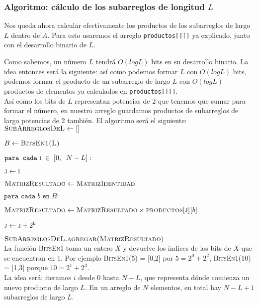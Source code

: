 \subsubsection{Algoritmo: cálculo de los subarreglos de longitud $L$}
Nos queda ahora calcular efectivamente los productos de los subarreglos de largo $L$ 
dentro de $A$. Para esto usaremos el arreglo \texttt{productos[][]} ya explicado, junto con 
el desarrollo binario de $L$. 

Como sabemos, un número $L$ tendrá $O(log L)$ bits en su desarrollo binario. La idea entonces 
será la siguiente: así como podemos formar $L$ con $O(log L)$ bits, podemos formar el producto 
de un subarreglo de largo $L$ con $O(log L)$ productos 
de elementos ya calculados en \texttt{productos[][]}.\\

Así como los bits de $L$ representan potencias de 2 que tenemos que sumar para formar el número, 
en nuestro arreglo guardamos productos de subarreglos de largo potencias de 2 también. El 
algoritmo será el siguiente: \\

$\textsc{SubArreglosDeL} \leftarrow \textsc{[]}$

$B \leftarrow \textsc{BitsEn1(L)}$

$\texttt{para cada} \; \textsc{i} \; \in \; [ 0, \; \; N-L]:$

\quad $\textsc{j} \leftarrow \textsc{i}$ 

\quad $\textsc{MatrizResultado} \leftarrow \textsc{MatrizIdentidad}$

\quad $\texttt{para cada} \; b \; \texttt{en} \; B:$

\quad \quad $\textsc{MatrizResultado} \leftarrow \textsc{MatrizResultado} \times \textsc{productos[j][}b\textsc{]}$

\quad \quad $\textsc{j} \leftarrow \textsc{j} + 2^{b}$ 

\quad $\textsc{SubArreglosDeL.agregar} \textsc{(MatrizResultado)}$\\

La función \textsc{BitsEn1} toma un entero $X$ y devuelve los índices 
de los bits de $X$ que se encuentran en 1. Por ejemplo \textsc{BitsEn1(5) = [0,2]} por $5 = 2^0 + 2^2$, 
\textsc{BitsEn1(10) = [1,3]} porque $10 = 2^1 + 2^3$.\\

La idea será: iteramos $i$ desde 0 hasta $N-L$, que representa dónde comienza un nuevo producto 
de largo $L$. En un arreglo de $N$ elementos, en total hay $N-L+1$ subarreglos de largo $L$. 


